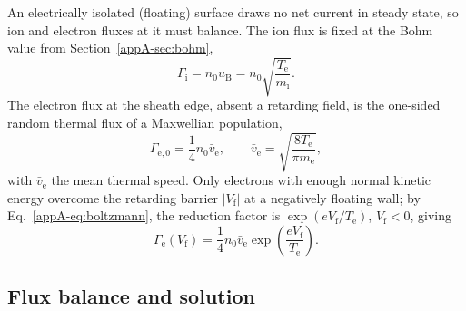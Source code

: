 An electrically isolated (floating) surface draws no net current in steady state, so ion and electron fluxes at it must balance. The ion flux is fixed at the Bohm value from Section~\ref{appA-sec:bohm},
\begin{equation}
\Gamma_{\mathrm{i}} = n_{0}u_{\mathrm{B}} = n_{0}\sqrt{\frac{T_{\mathrm{e}}}{m_{\mathrm{i}}}}.
\label{eq:ion_flux_floating}
\end{equation}
The electron flux at the sheath edge, absent a retarding field, is the one-sided random thermal flux of a Maxwellian population,
\begin{equation}
\Gamma_{\mathrm{e},0} = \frac{1}{4}n_{0}\bar{v}_{\mathrm{e}},
\qquad
\bar{v}_{\mathrm{e}} = \sqrt{\frac{8T_{\mathrm{e}}}{\pi m_{\mathrm{e}}}},
\label{eq:electron_random_flux}
\end{equation}
with $\bar{v}_{\mathrm{e}}$ the mean thermal speed. Only electrons with enough normal kinetic energy overcome the retarding barrier $|V_{\mathrm{f}}|$ at a negatively floating wall; by Eq.~\eqref{appA-eq:boltzmann}, the reduction factor is $\exp(eV_{\mathrm{f}}/T_{\mathrm{e}})$, $V_{\mathrm{f}}<0$, giving
\begin{equation}
\Gamma_{\mathrm{e}}(V_{\mathrm{f}}) = \frac{1}{4}n_{0}\bar{v}_{\mathrm{e}}\exp\!\left(\frac{eV_{\mathrm{f}}}{T_{\mathrm{e}}}\right).
\label{eq:electron_wall_flux}
\end{equation}

\subsection{Flux balance and solution}

